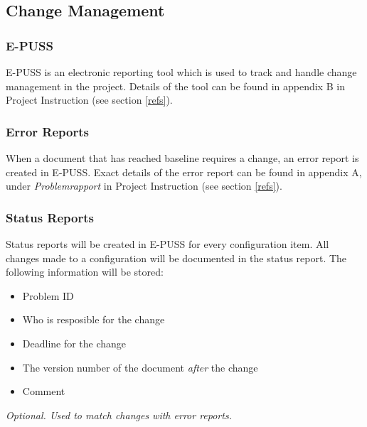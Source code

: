 \documentclass{article}
\begin{document}
    \subsection{Change Management \label{versioncontrol}} %
        \subsubsection{E-PUSS}
             E-PUSS is an electronic reporting tool which is used to track and handle
             change management in the project. Details of the tool can be found in appendix B
             in Project Instruction (see section \ref{refs}).

        \subsubsection{Error Reports}
            When a document that has reached baseline requires a change, an error report
            is created in E-PUSS. Exact details of the error report can be found in
            appendix A, under \textit{Problemrapport} in Project Instruction (see section \ref{refs}).

        \subsubsection{Status Reports}
            Status reports will be created in E-PUSS for every configuration item. All changes made to a configuration will be documented in the status report. The following information will be stored:
            \begin{itemize}
                \item Problem ID
                \item Who is resposible for the change
                \item Deadline for the change
                \item The version number of the document \emph{after} the change
                \item Comment
            \end{itemize}
            \noindent *\emph{Optional. Used to match changes with error reports. }
\end{document}
